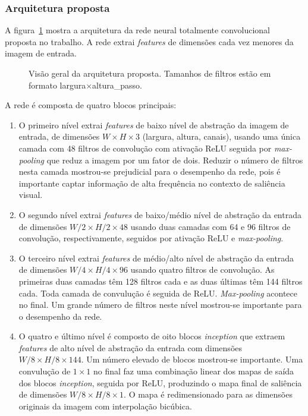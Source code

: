\documentclass[11pt]{article}
\newcommand{\tit}[1]{\textit{#1}}
\begin{document}
\subsubsection{Arquitetura proposta}
A figura~\ref{fig:model} mostra a arquitetura da rede neural totalmente
convolucional proposta no trabalho.
A rede extrai \tit{features} de dimensões cada vez menores da imagem de
entrada.

\begin{figure}[H]
    \centering
    \def\svgwidth{0.9\columnwidth}
    
    \label{fig:model}
    \caption{Visão geral da arquitetura proposta.
        Tamanhos de filtros estão em formato
        largura$\times$altura\_passo.}
\end{figure}

A rede é composta de quatro blocos principais:

\begin{enumerate}
    \item O primeiro nível extrai \tit{features} de baixo nível de abstração
        da imagem de entrada, de dimensões
        $W\times H \times 3$ (largura, altura, canais), usando uma única
        camada com 48 filtros de convolução com ativação ReLU seguida por
        \tit{max-pooling} que reduz a imagem por um fator de dois.
        Reduzir o número de filtros nesta camada mostrou-se prejudicial para
        o desempenho da rede, pois é importante captar informação de
        alta frequência no contexto de saliência visual.
    \item O segundo nível extrai \tit{features} de baixo/médio nível de
        abstração da entrada de dimensões $W/2 \times H/2 \times 48$
        usando duas camadas com 64 e 96 filtros de convolução, respectivamente,
        seguidos por ativação ReLU e \tit{max-pooling}.
    \item O terceiro nível extrai \tit{features} de médio/alto nível de
        abstração da entrada de dimensões $W/4 \times H/4 \times 96$ usando
        quatro filtros de convolução.
        As primeiras duas camadas têm 128 filtros cada e as duas últimas
        têm 144 filtros cada. Toda camada de convulução é seguida de ReLU.
        \tit{Max-pooling} acontece no final.
        Um grande número de filtros neste nível mostrou-se importante para
        o desempenho da rede.
    \item O quatro e último nível é composto de oito blocos \tit{inception}
        que extraem \tit{features} de alto nível de abstração da entrada
        com dimensões $W/8 \times H/8 \times 144$.
        Um número elevado de blocos mostrou-se importante.
        Uma convulução de $1 \times 1$ no final faz uma combinação linear
        dos mapas de saída dos blocos \tit{inception}, seguida por ReLU,
        produzindo o mapa final de saliência de dimensões
        $W/8 \times H/8 \times 1$.
        O mapa é redimensionado para as dimensões originais da imagem
        com interpolação bicúbica.
\end{enumerate}
\end{document}
